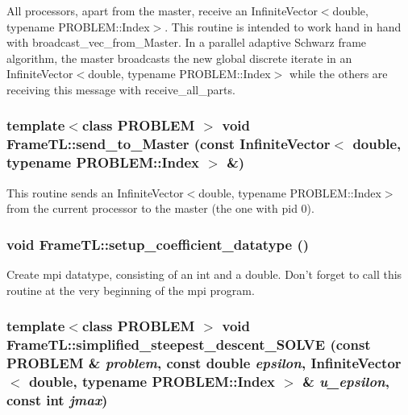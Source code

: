 All processors, apart from the master, receive an InfiniteVector$<$double, typename PROBLEM::Index$>$. This routine is intended to work hand in hand with broadcast\_\-vec\_\-from\_\-Master. In a parallel adaptive Schwarz frame algorithm, the master broadcasts the new global discrete iterate in an InfiniteVector$<$double, typename PROBLEM::Index$>$ while the others are receiving this message with receive\_\-all\_\-parts. \hypertarget{namespaceFrameTL_868f995657a7f68345fe24340658282e}{
\subsubsection[{send\_\-to\_\-Master}]{\setlength{\rightskip}{0pt plus 5cm}template$<$class PROBLEM $>$ void FrameTL::send\_\-to\_\-Master (const InfiniteVector$<$ double, typename PROBLEM::Index $>$ \&)}}
\label{namespaceFrameTL_868f995657a7f68345fe24340658282e}


This routine sends an InfiniteVector$<$double, typename PROBLEM::Index$>$ from the current processor to the master (the one with pid 0). \hypertarget{namespaceFrameTL_010a7b97f26561b6923f285c1cbb8d02}{
\subsubsection[{setup\_\-coefficient\_\-datatype}]{\setlength{\rightskip}{0pt plus 5cm}void FrameTL::setup\_\-coefficient\_\-datatype ()}}
\label{namespaceFrameTL_010a7b97f26561b6923f285c1cbb8d02}


Create mpi datatype, consisting of an int and a double. Don't forget to call this routine at the very beginning of the mpi program. \hypertarget{namespaceFrameTL_c04ff1f80c162c3369928a2b45402beb}{
\subsubsection[{simplified\_\-steepest\_\-descent\_\-SOLVE}]{\setlength{\rightskip}{0pt plus 5cm}template$<$class PROBLEM $>$ void FrameTL::simplified\_\-steepest\_\-descent\_\-SOLVE (const PROBLEM \& {\em problem}, \/  const double {\em epsilon}, \/  InfiniteVector$<$ double, typename PROBLEM::Index $>$ \& {\em u\_\-epsilon}, \/  const int {\em jmax})}}
\label{namespaceFrameTL_c04ff1f80c162c3369928a2b45402beb}


